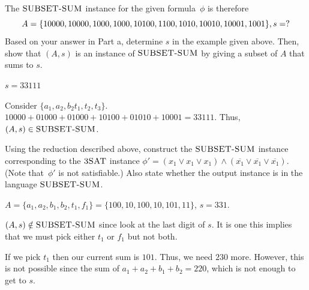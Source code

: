 \documentclass[12pt, letterpaper]{article}
\begin{document}
\begin{subproblem}{}
    The $\textsc{SUBSET-SUM}$ instance for the given formula~$\phi$ is therefore
  \[ A=\{10000,10000,1000,1000,10100,1100,1010,10010,10001,1001\},s=?
  \]
    Based on your answer in Part a, determine $s$ in the example given above. Then, show that $(A,s)$ is an instance of $\textsc{SUBSET-SUM}$ by giving a subset of $A$ that sums to $s$.
\end{subproblem}
\begin{solution}
    $s=33111$

    \noindent Consider $\{a_1,a_2,b_2t_1,t_2,t_3\}$. $10000+01000+01000+10100+01010+10001=33111$. Thus, $(A,s) \in \textsc{SUBSET-SUM}$.
\end{solution}
\newcommand{\TSAT}{\textsc{3SAT}}
\begin{subproblem}{}
    Using the reduction described above, construct the $\textsc{SUBSET-SUM}$ instance corresponding to the $\TSAT$ instance $\phi' = (x_1 \vee x_1 \vee x_1)\wedge (\overline{x_1}\vee \overline{x_1}\vee \overline{x_1})$.
    (Note that~$\phi'$ is not satisfiable.)
    Also state whether the output instance is in the language $\textsc{SUBSET-SUM}$.
\end{subproblem}
\begin{problemproof}
    $A=\{a_1,a_2,b_1,b_2,t_1,f_1\}=\{100,10,100,10,101,11\}$, $s=331$.

    $(A,s) \notin \textsc{SUBSET-SUM}$ since look at the last digit of $s$. It is one this implies that we must pick either $t_1$ or $f_1$ but not both.

    If we pick $t_1$ then our current sum is $101$. Thus, we need $230$ more. However, this is not possible since the sum of $a_1+a_2+b_1+b_2=220$, which is not enough to get to $s$.
\end{problemproof}
\end{document}
